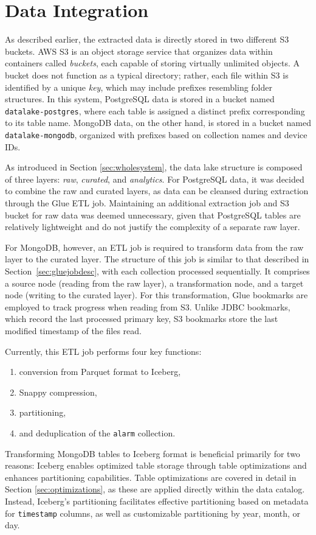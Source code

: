 \section{Data Integration}
As described earlier, the extracted data is directly stored in two different \ac{S3} buckets. \ac{AWS} \ac{S3} is an object storage service that organizes data within containers called \textit{buckets}, each capable of storing virtually unlimited objects. A bucket does not function as a typical directory; rather, each file within \ac{S3} is identified by a unique \textit{key}, which may include prefixes resembling folder structures. In this system, PostgreSQL data is stored in a bucket named \texttt{datalake-postgres}, where each table is assigned a distinct prefix corresponding to its table name. MongoDB data, on the other hand, is stored in a bucket named \texttt{datalake-mongodb}, organized with prefixes based on collection names and device IDs.

As introduced in Section \ref{sec:wholesystem}, the data lake structure is composed of three layers: \textit{raw}, \textit{curated}, and \textit{analytics}. For PostgreSQL data, it was decided to combine the raw and curated layers, as data can be cleansed during extraction through the Glue \ac{ETL} job. Maintaining an additional extraction job and \ac{S3} bucket for raw data was deemed unnecessary, given that PostgreSQL tables are relatively lightweight and do not justify the complexity of a separate raw layer.

For MongoDB, however, an \ac{ETL} job is required to transform data from the raw layer to the curated layer. The structure of this job is similar to that described in Section~\ref{sec:gluejobdesc}, with each collection processed sequentially. It comprises a source node (reading from the raw layer), a transformation node, and a target node (writing to the curated layer). For this transformation, Glue bookmarks are employed to track progress when reading from \ac{S3}. Unlike \ac{JDBC} bookmarks, which record the last processed primary key, \ac{S3} bookmarks store the last modified timestamp of the files read.

Currently, this \ac{ETL} job performs four key functions:
\begin{enumerate}
    \item conversion from Parquet format to Iceberg,
    \item Snappy compression,
    \item partitioning,
    \item and deduplication of the \texttt{alarm} collection.
\end{enumerate}
Transforming MongoDB tables to Iceberg format is beneficial primarily for two reasons: Iceberg enables optimized table storage through table optimizations and enhances partitioning capabilities. Table optimizations are covered in detail in Section \ref{sec:optimizations}, as these are applied directly within the data catalog. Instead, Iceberg's partitioning facilitates effective partitioning based on metadata for \texttt{timestamp} columns, as well as customizable partitioning by year, month, or day.

